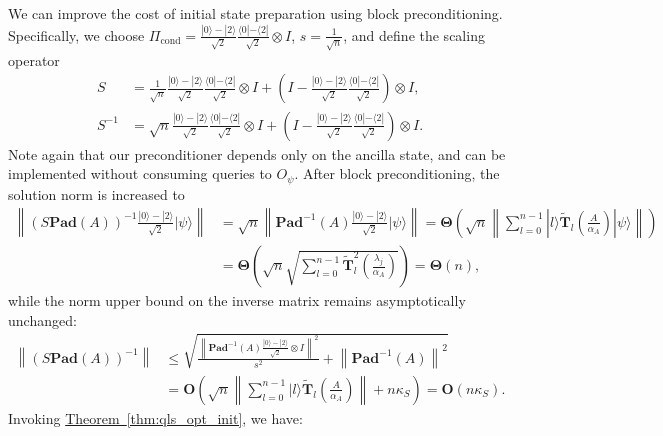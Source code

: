\documentclass[letterpaper,onecolumn,11pt,accepted=2026-02-14]{quantumarticle}
\newcommand{\norm}[1]{\left\lVert#1\right\rVert}
\theoremstyle{remark}
\theoremstyle{plain}
\newcommand{\thm}[1]{\hyperref[thm:#1]{Theorem~\ref*{thm:#1}}}
\newcommand{\ket}[1]{|#1\rangle}
\newcommand{\bra}[1]{\langle#1|}
\begin{document}
We can improve the cost of initial state preparation using block preconditioning. Specifically, we choose $\Pi_{\text{cond}}=\frac{\ket{0}-\ket{2}}{\sqrt{2}}\frac{\bra{0}-\bra{2}}{\sqrt{2}}\otimes I$, $s=\frac{1}{\sqrt{n}}$, and define the scaling operator
\begin{equation}
\begin{aligned}
    S&=\frac{1}{\sqrt{n}}\frac{\ket{0}-\ket{2}}{\sqrt{2}}\frac{\bra{0}-\bra{2}}{\sqrt{2}}\otimes I
    +\left(I-\frac{\ket{0}-\ket{2}}{\sqrt{2}}\frac{\bra{0}-\bra{2}}{\sqrt{2}}\right)\otimes I,\\
    S^{-1}&=\sqrt{n}\frac{\ket{0}-\ket{2}}{\sqrt{2}}\frac{\bra{0}-\bra{2}}{\sqrt{2}}\otimes I
    +\left(I-\frac{\ket{0}-\ket{2}}{\sqrt{2}}\frac{\bra{0}-\bra{2}}{\sqrt{2}}\right)\otimes I.
\end{aligned}
\end{equation}
Note again that our preconditioner depends only on the ancilla state, and can be implemented without consuming queries to $O_\psi$. After block preconditioning, the solution norm is increased to~\cite[Lemma 17]{QEVP}
\begin{equation}
\begin{aligned}
    \norm{\left(S\mathbf{Pad}(A)\right)^{-1}\frac{\ket{0}-\ket{2}}{\sqrt{2}}\ket{\psi}}
    &=\sqrt{n}\norm{\mathbf{Pad}^{-1}(A)\frac{\ket{0}-\ket{2}}{\sqrt{2}}\ket{\psi}}
    =\mathbf{\Theta}\left(\sqrt{n}\norm{\sum_{l=0}^{n-1}\ket{l}\widetilde{\mathbf{T}}_l\left(\frac{A}{\alpha_A}\right)\ket{\psi}}\right)\\
    &=\mathbf{\Theta}\left(\sqrt{n}\sqrt{\sum_{l=0}^{n-1}\widetilde{\mathbf{T}}_l^2\left(\frac{\lambda_j}{\alpha_A}\right)}\right)
    =\mathbf{\Theta}(n),
\end{aligned}
\end{equation}
while the norm upper bound on the inverse matrix remains asymptotically unchanged:
\begin{equation}
\begin{aligned}
    \norm{\left(S\mathbf{Pad}(A)\right)^{-1}}
    &\leq\sqrt{\frac{\norm{\mathbf{Pad}^{-1}(A)\frac{\ket{0}-\ket{2}}{\sqrt{2}}\otimes I}^2}{s^2}
    +\norm{\mathbf{Pad}^{-1}(A)}^2}\\
    &=\mathbf{O}\left(\sqrt{n}\norm{\sum_{l=0}^{n-1}\ket{l}\widetilde{\mathbf{T}}_l\left(\frac{A}{\alpha_A}\right)}
    +n\kappa_S\right)
    =\mathbf{O}(n\kappa_S).
\end{aligned}
\end{equation}
Invoking \thm{qls_opt_init}, we have:
\end{document}
